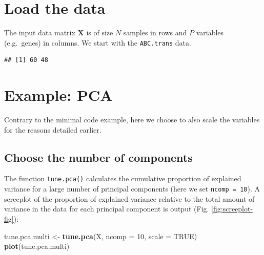 \documentclass[]{book}
\newenvironment{Shaded}{\begin{snugshade}}{\end{snugshade}}
\newcommand{\KeywordTok}[1]{\textcolor[rgb]{0.13,0.29,0.53}{\textbf{#1}}}
\newcommand{\DataTypeTok}[1]{\textcolor[rgb]{0.13,0.29,0.53}{#1}}
\newcommand{\DecValTok}[1]{\textcolor[rgb]{0.00,0.00,0.81}{#1}}
\newcommand{\StringTok}[1]{\textcolor[rgb]{0.31,0.60,0.02}{#1}}
\newcommand{\CommentTok}[1]{\textcolor[rgb]{0.56,0.35,0.01}{\textit{#1}}}
\newcommand{\OtherTok}[1]{\textcolor[rgb]{0.56,0.35,0.01}{#1}}
\newcommand{\OperatorTok}[1]{\textcolor[rgb]{0.81,0.36,0.00}{\textbf{#1}}}
\newcommand{\NormalTok}[1]{#1}
\begin{document}
\section{Load the data}\label{pca:load}

The input data matrix \(\boldsymbol{X}\) is of size \(N\) samples in
rows and \(P\) variables (e.g.~genes) in columns. We start with the
\texttt{ABC.trans} data.

\begin{Shaded}
\end{Shaded}

\begin{verbatim}
## [1] 60 48
\end{verbatim}

\section{Example: PCA}\label{pca:ex}

Contrary to the minimal code example, here we choose to also scale the
variables for the reasons detailed earlier.

\subsection{Choose the number of components}\label{optimal-param-choice}

The function \texttt{tune.pca()} calculates the cumulative proportion of
explained variance for a large number of principal components (here we
set \texttt{ncomp\ =\ 10}). A screeplot of the proportion of explained
variance relative to the total amount of variance in the data for each
principal component is output (Fig. \ref{fig:screeplot-fig}):

\begin{Shaded}
\begin{Highlighting}[]
\NormalTok{tune.pca.multi <-}\StringTok{ }\KeywordTok{tune.pca}\NormalTok{(X, }\DataTypeTok{ncomp =} \DecValTok{10}\NormalTok{, }\DataTypeTok{scale =} \OtherTok{TRUE}\NormalTok{)}
\KeywordTok{plot}\NormalTok{(tune.pca.multi)}
\end{Highlighting}
\end{Shaded}
\end{document}
